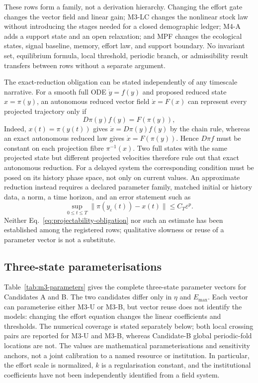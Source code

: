 \documentclass[11pt]{article}
\begin{document}
These rows form a family, not a derivation hierarchy. Changing the effort gate changes the vector field and linear gain; M3-LC changes the nonlinear stock law without introducing the stages needed for a closed demographic ledger; M4-A adds a support state and an open relaxation; and MPF changes the ecological states, signal baseline, memory, effort law, and support boundary. No invariant set, equilibrium formula, local threshold, periodic branch, or admissibility result transfers between rows without a separate argument.

The exact-reduction obligation can be stated independently of any timescale narrative. For a smooth full ODE $\dot y=f(y)$ and proposed reduced state $x=\pi(y)$, an autonomous reduced vector field $\dot x=F(x)$ can represent every projected trajectory only if
\begin{equation}
D\pi(y)f(y)=F(\pi(y)),
\label{eq:projectability-obligation}
\end{equation}
Indeed, $x(t)=\pi(y(t))$ gives $\dot x=D\pi(y)f(y)$ by the chain rule, whereas an exact autonomous reduced law gives $\dot x=F(\pi(y))$. Hence $D\pi f$ must be constant on each projection fibre $\pi^{-1}(x)$. Two full states with the same projected state but different projected velocities therefore rule out that exact autonomous reduction. For a delayed system the corresponding condition must be posed on its history phase space, not only on current values. An approximate reduction instead requires a declared parameter family, matched initial or history data, a norm, a time horizon, and an error statement such as
\[
\sup_{0\le t\le T}\|\pi(y_\varepsilon(t))-x(t)\|
\le C_T\varepsilon^p.
\]
Neither Eq.~\eqref{eq:projectability-obligation} nor such an estimate has been established among the registered rows; qualitative slowness or reuse of a parameter vector is not a substitute.

\subsection{Three-state parameterisations}

Table~\ref{tab:m3-parameters} gives the complete three-state parameter vectors for Candidates A and B. The two candidates differ only in $\eta$ and $E_{\max}$. Each vector can parameterise either M3-U or M3-B, but vector reuse does not identify the models: changing the effort equation changes the linear coefficients and thresholds. The numerical coverage is stated separately below; both local crossing pairs are reported for M3-U and M3-B, whereas Candidate-B global periodic-fold locations are not. The values are mathematical parameterisations and sensitivity anchors, not a joint calibration to a named resource or institution. In particular, the effort scale is normalized, $k$ is a regularisation constant, and the institutional coefficients have not been independently identified from a field system.
\end{document}
